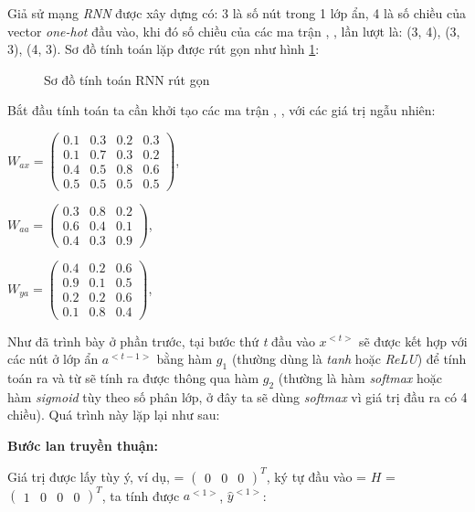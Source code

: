 Giả sử mạng \textit{RNN} được xây dựng có: 3 là số nút trong 1 lớp ẩn, 4 là số chiều của vector \textit{ one-hot} đầu vào, khi đó số chiều của các ma trận \wax, \waa, \wya \space lần lượt là: (3, 4), (3, 3), (4, 3).
Sơ đồ tính toán lặp được rút gọn như hình \ref{folding}:

\begin{figure}[H]
    \begin{center}
        
    \end{center}
    \caption{Sơ đồ tính toán RNN rút gọn}
    \label{folding}
\end{figure}

Bắt đầu tính toán ta cần khởi tạo các ma trận \wax, \waa, \wya \space với các giá trị ngẫu nhiên:

$W_{ax} =
\begin{pmatrix}
0.1 & 0.3 & 0.2 & 0.3\\
0.1 & 0.7 & 0.3 & 0.2\\
0.4 & 0.5 & 0.8 & 0.6\\
0.5 & 0.5 & 0.5 & 0.5
\end{pmatrix} $,

$W_{aa} =
\begin{pmatrix}
0.3 & 0.8 & 0.2 \\
0.6 & 0.4 & 0.1 \\
0.4 & 0.3 & 0.9
\end{pmatrix} $,

$W_{ya} =
\begin{pmatrix}
0.4 & 0.2 & 0.6\\
0.9 & 0.1 & 0.5\\
0.2 & 0.2 & 0.6\\
0.1 & 0.8 & 0.4
\end{pmatrix}$,

Như đã trình bày ở phần trước, tại bước thứ \textit{t} đầu vào $x^{<t>}$ sẽ được kết hợp với các nút ở lớp ẩn $a^{<t-1>}$ bằng hàm $g_{1}$ (thường dùng là \textit{tanh} hoặc \textit{ReLU}) để tính toán ra  và từ  sẽ tính ra được  thông qua hàm $g_{2}$ (thường là hàm \textit{softmax} hoặc hàm \textit{sigmoid} tùy theo số phân lớp, ở đây ta sẽ dùng \textit{softmax} vì giá trị đầu ra  có 4 chiều). Quá trình này lặp lại như sau:

\textbf{Bước lan truyền thuận:}

Giá trị  được lấy tùy ý, ví dụ,  = $\begin{pmatrix} 0 & 0 & 0 \end{pmatrix} ^{T}$,  ký tự đầu vào  = $H$ =  $\begin{pmatrix} 1 & 0 & 0 & 0 \end{pmatrix} ^{T} $, ta tính được $a^{<1>}$, $\widehat{y}^{<1>}$:

